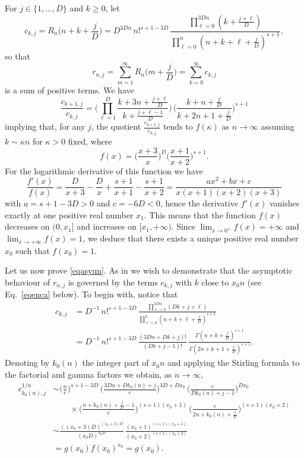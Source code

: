 \documentclass{article}
\numberwithin{equation}{section}
\theoremstyle{remark}
\newenvironment{Proof}[1][Proof]{\proof[\rm\textbf{#1}]}{\endproof}
\begin{document}
\begin{Proof}
For $j\in \{1,\ldots,D\}$ and $k\geq 0$, let 
$$c_{k,j} = R_n\Big( n+k+\frac{j}{D}\Big) 
= D^{ 3D n} \, n!^{s+1-3D} \, \frac{ \prod_{\ell=0}^{3Dn} ( k +\frac{j+\ell }{D})}{ \prod_{\ell=0}^{ n} (n+k+\ell+\frac{j}{D})^{s+1}},$$
so that 
$$r_{n,j} = \sum_{m=1}^\infty R_n\Big(m+\frac{j}{D}\Big) = \sum_{k=0}^\infty c_{k,j}$$
is a sum  of positive terms.
We have
\begin{equation} \label{eqquok}
\frac{c_{k+1,j}}{c_{k,j}} = \bigg( \prod_{\ell = 1}^D \frac{k+3n+\frac{j+\ell}{D}}{k+\frac{j+\ell-1}{D}}\bigg) \, \bigg( \frac{k+n+\frac{j}{D}}{k+2n+1+ \frac{j}{D}}\bigg)^{s+1}
\end{equation}
implying that, for any $j$, the quotient $\frac{c_{k+1,j}}{c_{k,j}}$ tends to $ f(\kappa)$ as $n\to\infty$ assuming $k\sim \kappa n$ for $\kappa>0$ fixed, where 
$$f(x) = \Big( \frac{ x+ 3 }{x}\Big) ^D \Big( \frac{ x+ 1 }{x+2}\Big) ^{s+1}.$$
For the logarithmic derivative of this function we have
$$\frac{f'(x)}{f(x)} = 
\frac{D}{x+3} - \frac{D}{x }+\frac{s+1}{x+ 1 } - \frac{s+1}{x+ 2} =
\frac{ ax^2+bx+c}{x(x+1)(x+2)(x+3)}$$
with 
$a = s+1-3D > 0$ and $c = -6   D < 0$, hence the derivative $f'(x)$ vanishes exactly at one positive real number $x_1$. 
This means that the function $f(x)$ decreases on $(0, x_1]$ and increases on $[x_1,+\infty)$. Since $\lim_{x\to 0^+} f(x) = +\infty$ and $\lim_{x\to+\infty} f(x) = 1$, we deduce that there exists a unique positive real number $x_0$ such that $f(x_0 ) = 1$.

\bigskip


Let us now prove \eqref{eqasyun}. 
As in \cite[\S 3.4]{Bruijn} we wish to demonstrate that the asymptotic behaviour of $r_{n,j}$ is governed by the terms $c_{k,j}$ with $k$ close to $x_0n $ (see Eq.~\eqref{eqenca} below). To begin with, notice that 
\begin{align*}
c_{k,j} 
&= D^{-1} \, n!^{s+1-3D} \, \frac{ \prod_{\ell=0}^{3Dn} ( Dk+j+\ell )}{ \prod_{\ell=0}^{ n} (n+k+\ell+\frac{j}{D})^{s+1}}\\
&= D^{-1} \, n!^{s+1-3D} \, \frac{(3Dn+Dk+j)!}{(Dk+j-1)!} \, \frac{\Gamma(n+k+\frac{j}{D})^{s+1}}{\Gamma (2n+k +1+\frac{j}{D})^{s+1}}.
\end{align*}
Denoting by $k_0 (n) $ the integer part of $x_0 n$ and applying the Stirling formula to the factorial and gamma factors we obtain, as $n\to\infty$,
\begin{align}
c_{k_0(n),j}^{1/n} 
&\sim
\Big(\frac{n}{e}\Big) ^{s+1-3D} \,  \bigg(\frac{3Dn+Dk_0(n)+j }{e}\bigg) ^{ 3D+Dx_0} 
 \, \bigg(\frac{e}{Dk_0(n)+j-1 }\bigg) ^{ Dx_0} \nonumber \\
& \qquad \times 
\bigg(\frac{n+k_0(n)+\frac{j}{D} -1 }{e}\bigg) ^{ (s+1)( x_0+1)} 
 \, \bigg(\frac{e}{2n+k_0(n) +\frac{j}{D}}\bigg) ^{ (s+1)( x_0+2)} \nonumber \\
 &\sim \frac{((x_0+3)D)^{ (x_0+3)D}}{(x_0D)^{x_0D}}\, \frac{(x_0+1)^{(s+1)(x_0+1)} }{(x_0+2)^{(s+1)( x_0+2)} } \nonumber \\
& = g(x_0) f(x_0)^{x_0} = g(x_0). \label{eqasykz}
\end{align}



\end{Proof}
\end{document}
